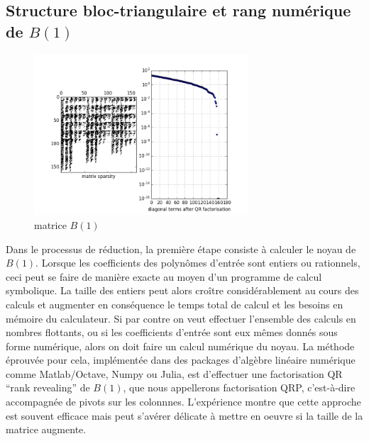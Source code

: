 \documentclass{standalone}
\begin{document}
\subsection{Structure bloc-triangulaire et rang numérique de $B(1)$}

\begin{figure}
  \caption{matrice $B(1)$}
  \label{fig:diag_B1}
  \includegraphics[width=8cm]{../png/bez_diag.png}
\end{figure}
Dans le processus de réduction, la première étape consiste à calculer le noyau de $B(1)$. Lorsque les coefficients des polynômes d'entrée sont entiers ou rationnels, ceci peut se faire de manière exacte au moyen d'un programme de calcul symbolique. La taille des entiers peut alors croître considérablement au cours des calculs et augmenter en conséquence le temps total de calcul et les besoins en mémoire du calculateur. Si par contre on veut effectuer l'ensemble des calculs en nombres flottants, ou si les coefficients d'entrée sont eux mêmes donnés sous forme numérique, alors on doit faire un calcul numérique du noyau. 
La méthode éprouvée pour cela, implémentée dans des packages d'algèbre linéaire numérique comme Matlab/Octave, Numpy ou Julia, est d'effectuer une factorisation QR ``rank revealing'' de $B(1)$, que nous appellerons factorisation QRP, c'est-à-dire accompagnée de pivots sur les colonnnes. L'expérience montre que cette approche est souvent efficace mais peut s'avérer délicate à mettre en oeuvre si la taille de la matrice augmente. 
\end{document}
